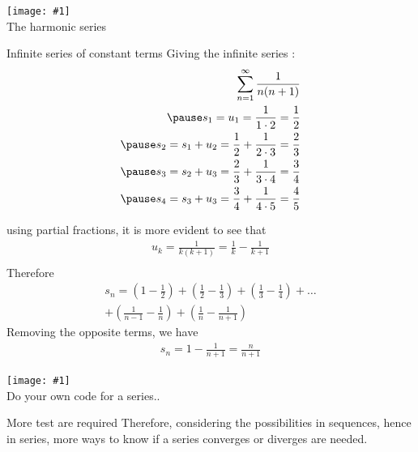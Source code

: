 \documentclass[newPxFont]{beamer}
\newcommand \imageFrame[2]{
\begingroup
\begin{frame}
  \begin{center}
\texttt{[image: \#1]}\\
\Large #2
    \end{center}
\end{frame}
\endgroup
}
\begin{document}
\imageFrame{harmonic}{The harmonic series}
\begin{frame}{Infinite series of constant terms}
Giving the infinite series :
\begin{eqnarray*}
  \sum_{n=1}^\infty \frac{1}{n(n+1)}\\\pause
  s_1=u_1=\frac{1}{1\cdot2}=\frac{1}{2}\\\pause
  s_2=s_1+u_2=\frac{1}{2}+\frac{1}{2\cdot3}=\frac{2}{3}\\\pause
  s_3=s_2+u_3=\frac{2}{3}+\frac{1}{3\cdot4}=\frac{3}{4}\\\pause
  s_4=s_3+u_3=\frac{3}{4}+\frac{1}{4\cdot5}=\frac{4}{5}\\
\end{eqnarray*}
\end{frame}
\begin{frame}
using partial fractions, it is more evident to see that
\begin{eqnarray*}
  u_k=\frac{1}{k(k+1)}=\frac{1}{k}-\frac{1}{k+1}\\
  \end{eqnarray*}
  Therefore
  \begin{eqnarray*}
  s_n=\left(1-\frac{1}{2}\right)+\left(\frac{1}{2} -\frac{1}{3}\right)+\left(\frac{1}{3} -\frac{1}{4}\right)+\hdots\\+ \left(\frac{1}{n-1} -\frac{1}{n}\right)+ \left(\frac{1}{n} -\frac{1}{n+1}\right)
  \end{eqnarray*}
  Removing the opposite terms, we have
  \begin{eqnarray*}
  s_n=1-\frac{1}{n+1}=\frac{n}{n+1}
\end{eqnarray*}
\end{frame}
\imageFrame{exer2}{Do your own code for a series..}
\begin{frame}{More test are required}
Therefore, considering the possibilities in sequences, hence in series, more ways to know if a series  \alert{converges} or \alert{diverges} are needed.
\end{frame}
\end{document}
